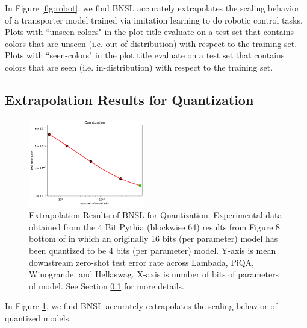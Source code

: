 \documentclass{article} %
\begin{document}
\vspace{-1.0mm}

In Figure \ref{fig:robot}, we find BNSL accurately extrapolates the scaling behavior of a transporter \citep{zeng2021transporter} model trained via imitation learning to do robotic control tasks. Plots with ``unseen-colors" in the plot title evaluate on a test set that contains colors that are unseen (i.e. out-of-distribution) with respect to the training set. Plots with ``seen-colors" in the plot title evaluate on a test set that contains colors that are seen (i.e. in-distribution) with respect to the training set.

\vspace{-1.0mm}

\clearpage

\subsection{Extrapolation Results for Quantization}
\label{section:quantization}
\vspace{-3.0mm}
\begin{figure}[htbp]
    \centering
\includegraphics[width=0.45\textwidth]{figures/quantization/quantization.png}
\vspace{-3.0mm}
    \caption{
Extrapolation Results of BNSL for Quantization. Experimental data obtained from the 4 Bit Pythia (blockwise 64) results from Figure 8 bottom of \cite{dettmers2022case} in which an originally 16 bits (per parameter) model has been quantized to be 4 bits (per parameter) model. Y-axis is mean downstream zero-shot test error rate across Lambada, PiQA, Winogrande, and Hellaswag. X-axis is number of bits of parameters of model. See Section \ref{section:quantization} for more details.
    }
    \label{fig:quantization}
\end{figure}
\vspace{-1.0mm}
In Figure \ref{fig:quantization}, we find BNSL accurately extrapolates the scaling behavior of quantized models.
\end{document}

